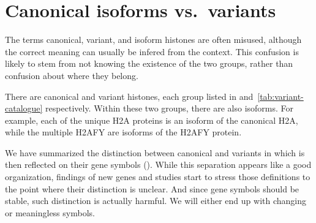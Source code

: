 \section{Canonical isoforms vs.~variants}


  The terms canonical, variant, and isoform histones are often misused, although
  the correct meaning can usually be infered from the context. This
  confusion is likely to stem from not knowing the existence of the two groups,
  rather than confusion about where they belong.

  There are canonical and variant histones, each group listed in 
  and~\ref{tab:variant-catalogue} respectively. Within these two groups,
  there are also isoforms. For example, each of the \HTwoAUniqueProteins{} unique H2A proteins
  is an isoform of the canonical H2A, while the multiple H2AFY are isoforms of
  the H2AFY protein.

  We have summarized the distinction between canonical and variants in
   which is then reflected on their
  gene symbols (). While this separation appears like a
  good organization, findings of new genes and studies start to stress those
  definitions to the point where their distinction is unclear. And since
  gene symbols should be stable, such distinction is actually harmful. We will
  either end up with changing or meaningless symbols.



